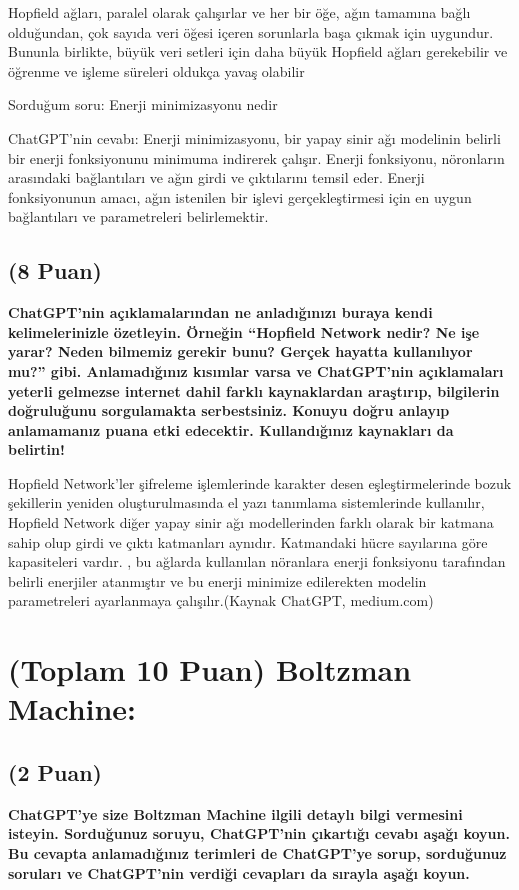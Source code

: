 \documentclass[11pt]{article}
\begin{document}
Hopfield ağları, paralel olarak çalışırlar ve her bir öğe, ağın tamamına bağlı olduğundan, çok sayıda veri öğesi içeren sorunlarla başa çıkmak için uygundur. Bununla birlikte, büyük veri setleri için daha büyük Hopfield ağları gerekebilir ve öğrenme ve işleme süreleri oldukça yavaş olabilir

\item Sorduğum soru: Enerji minimizasyonu nedir
\item ChatGPT'nin cevabı: Enerji minimizasyonu, bir yapay sinir ağı modelinin belirli bir enerji fonksiyonunu minimuma indirerek çalışır. Enerji fonksiyonu, nöronların arasındaki bağlantıları ve ağın girdi ve çıktılarını temsil eder. Enerji fonksiyonunun amacı, ağın istenilen bir işlevi gerçekleştirmesi için en uygun bağlantıları ve parametreleri belirlemektir.

\subsection{(8 Puan)} \textbf{ChatGPT’nin açıklamalarından ne anladığınızı buraya kendi kelimelerinizle özetleyin. Örneğin ``Hopfield Network nedir? Ne işe yarar? Neden bilmemiz gerekir bunu? Gerçek hayatta kullanılıyor mu?'' gibi. Anlamadığınız kısımlar varsa ve ChatGPT’nin açıklamaları yeterli gelmezse internet dahil farklı kaynaklardan araştırıp, bilgilerin doğruluğunu sorgulamakta serbestsiniz. Konuyu doğru anlayıp anlamamanız puana etki edecektir. Kullandığınız kaynakları da belirtin!}

\item Hopfield Network'ler şifreleme işlemlerinde karakter desen eşleştirmelerinde bozuk şekillerin yeniden oluşturulmasında el yazı tanımlama sistemlerinde kullanılır, Hopfield Network diğer yapay sinir ağı modellerinden farklı olarak bir katmana sahip olup girdi ve çıktı katmanları aynıdır. Katmandaki hücre sayılarına göre kapasiteleri vardır. , bu ağlarda kullanılan nöranlara enerji fonksiyonu tarafından belirli enerjiler atanmıştır ve bu enerji minimize edilerekten modelin parametreleri ayarlanmaya çalışılır.(Kaynak ChatGPT, medium.com)

\section{(Toplam 10 Puan) Boltzman Machine:}

\subsection{(2 Puan)} \textbf{ChatGPT’ye size Boltzman Machine ilgili detaylı bilgi vermesini isteyin. Sorduğunuz soruyu, ChatGPT'nin çıkartığı cevabı aşağı koyun. Bu cevapta anlamadığınız terimleri de ChatGPT’ye sorup, sorduğunuz soruları ve ChatGPT’nin verdiği cevapları da sırayla aşağı koyun.}
\end{document}
